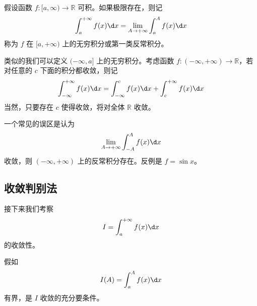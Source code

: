 \begin{definition}
	假设函数 $f : [a, \infty) \to \mathbb{R}$ 可积。如果极限存在，则记
	\[ \int_{a}^{+\infty} f(x) \d x = \lim_{A \to +\infty} \int_{a}^{A} f(x) \d x \]
	称为 $f$ 在 $[a, +\infty)$ 上的无穷积分或第一类反常积分。
\end{definition}

类似的我们可以定义 $(-\infty, a]$ 上的无穷积分。考虑函数 $f : (-\infty, +\infty) \to \mathbb{R}$，若对任意的 $c$ 下面的积分都收敛，则记
\[ \int_{-\infty}^{+\infty} f(x) \d x = \int_{-\infty}^{c} f(x) \d x + \int_{c}^{+\infty}f(x) \d x \]
当然，只要存在 $c$ 使得收敛，将对全体 $\mathbb{R}$ 收敛。

一个常见的误区是认为
\[ \lim_{A \to +\infty} \int_{-A}^{A} f(x) \d x \]
收敛，则 $(-\infty, +\infty)$ 上的反常积分存在。反例是 $f = \sin x$。

\subsection{收敛判别法}

接下来我们考察
\[ I = \int_{a}^{+\infty} f(x) \d x \]
的收敛性。

\begin{theorem}[有界判别法]
	假如
	\[ I(A) = \int_{a}^{A} f(x) \d x \]
	有界，是 $I$ 收敛的充分要条件。
\end{theorem}

